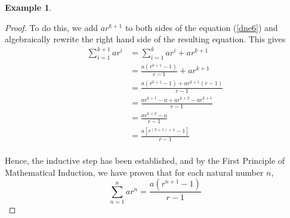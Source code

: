 \documentclass{book}
\theoremstyle{definition}
\newtheorem{example}{Example}[definition]
\theoremstyle{remark}
\begin{document}
\begin{example}
\begin{proof}
        To do this, we add $ar^{k+1}$ to both sides of the equation (\ref{dne6}) and algebraically rewrite the right hand side of the resulting equation. This gives
            \begin{align*}
                \sum_{i=1}^{k+1}{ar^i} & = \sum_{i=1}^{k}{ar^i} + ar^{k+1} \\
                    & = \frac{a(r^{k+1} - 1)}{r - 1} + ar^{k+1} \\
                    & = \frac{a(r^{k+1} - 1) + ar^{k+1}(r-1)}{r - 1} \\
                    & = \frac{ar^{k+1} - a + ar^{k+2} - ar^{k+1}}{r - 1} \\
                    & = \frac{ar^{k+2} - a}{r - 1} \\
                    & = \frac{a[r^{(k+1) + 1} - 1]}{r - 1} \\
        \end{align*}
        
        Hence, the inductive step has been established, and by the First Principle of Mathematical Induction, we have proven that for each natural number $n$,
            \begin{equation*}
                \sum_{n=1}^{n}{ar^n} = \frac{a(r^{n+1} - 1)}{r - 1}
            \end{equation*}
    \end{proof}
\end{example}
\end{document}
